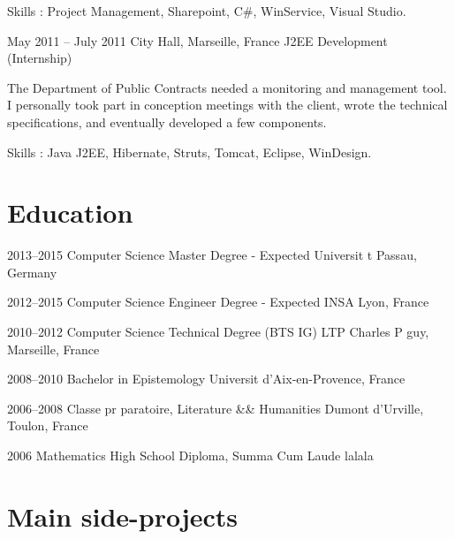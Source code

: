 \documentclass[fontsize=10pt]{tccv}
\begin{document}
\begin{eventlist}
Skills : Project Management, Sharepoint, C#, WinService, Visual Studio.

\item{May 2011 -- July 2011}
     {City Hall, Marseille, France}
     {J2EE Development (Internship)}

The Department of Public Contracts needed a monitoring and management tool.
I personally took part in conception meetings with the client, wrote the technical specifications, and eventually developed a few components.

Skills : Java J2EE, Hibernate, Struts, Tomcat, Eclipse, WinDesign.

\end{eventlist}


\section{Education}

\begin{list}

\item{2013--2015}
     {Computer Science Master Degree - Expected}
     {Universit t Passau, Germany}

\item{2012--2015}
     {Computer Science Engineer Degree - Expected}
     {INSA Lyon, France}

\item{2010--2012}
     {Computer Science Technical Degree (BTS IG)}
     {LTP Charles P guy, Marseille, France}

\item{2008--2010}
     {Bachelor in Epistemology}
     {Universit d'Aix-en-Provence, France}

\item{2006--2008}
     {Classe pr paratoire, Literature && Humanities}
     {Dumont d'Urville, Toulon, France}

\item{2006}
     {Mathematics High School Diploma, Summa Cum Laude}
     {lalala}

\end{list}

\section{Main side-projects}
\end{document}
